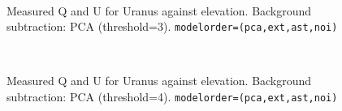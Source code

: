 \documentclass[twoside,11pt]{starlink}
\begin{document}
\begin{figure}[H]
\centering
{}
\hspace*{10pt}
\\
\caption{Measured Q and U for Uranus against elevation. Background
subtraction: PCA (threshold=3). \texttt{modelorder=(pca,ext,ast,noi)}}
\label{fig:urback5}
\end{figure}

\begin{figure}[H]
\centering
{}
\hspace*{10pt}
\\
\caption{Measured Q and U for Uranus against elevation. Background
subtraction: PCA (threshold=4). \texttt{modelorder=(pca,ext,ast,noi)}}
\label{fig:urback6}
\end{figure}
\end{document}
